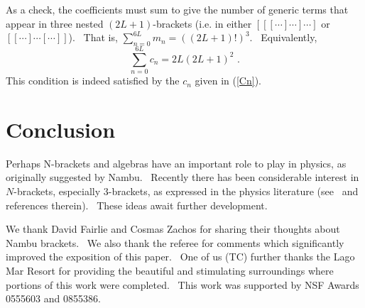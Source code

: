\documentclass[aps,preprint,tightenlines,unsortedaddress,11pt]{revtex4}\usepackage{amsfonts}
\begin{document}
As a check, the coefficients must sum to give the number of generic terms that
appear in three nested $\left(  2L+1\right)  $-brackets (i.e. in either
$\left[  \left[  \left[  \cdots\right]  \cdots\right]  \cdots\right]  $ or
$\left[  \left[  \cdots\right]  \cdots\left[  \cdots\right]  \right]  $).
\ That is, $\sum_{n=0}^{6L}m_{n}=\left(  \left(  2L+1\right)  !\right)  ^{3}$.
\ Equivalently,
\begin{equation}
\sum_{n=0}^{6L}c_{n}=2L\left(  2L+1\right)  ^{2}\text{ .} \label{Check}\end{equation}
This condition is indeed satisfied by the $c_{n}$ given in (\ref{Cn}).

\section{Conclusion}

Perhaps N-brackets and algebras have an important role to play in physics, as
originally suggested by Nambu. \ Recently there has been considerable interest
in $N$-brackets, especially $3$-brackets, as expressed in the physics
literature (see \cite{CFJMZ}\ and references therein). \ These ideas await
further development.

\begin{acknowledgments}
We thank David Fairlie and Cosmas Zachos for sharing their thoughts about
Nambu brackets. \ We also thank the referee for comments which significantly
improved the exposition of this paper. \ One of us (TC) further thanks the
Lago Mar Resort for providing the beautiful and stimulating surroundings where
portions of this work were completed. \ This work was supported by NSF Awards
0555603 and 0855386.
\end{acknowledgments}
\end{document}
